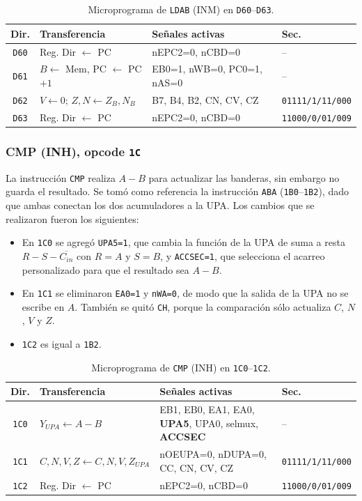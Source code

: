 \documentclass[letterpaper,12pt]{article}
\newcommand{\hx}[1]{\texttt{#1}}
\begin{document}
\begin{table}[H]
\centering
\scriptsize
\caption{Microprograma de \texttt{LDAB} (INM) en \hx{D60}--\hx{D63}.}
\label{tab:ldabinm}
\begin{tabularx}{\linewidth}{c l Y l}
\toprule
Dir. & Transferencia & Señales activas & Sec. \\
\midrule
\hx{D60} & Reg. Dir $\leftarrow$ PC & nEPC2=0, nCBD=0 & -- \\
\hx{D61} & $B\leftarrow$ Mem, PC $\leftarrow$ PC$+1$ & EB0=1, nWB=0, PC0=1, nAS=0 & -- \\
\hx{D62} & $V\leftarrow 0$; $Z,N\leftarrow Z_B,N_B$ & B7, B4, B2, CN, CV, CZ & \texttt{01111/1/11/000} \\
\hx{D63} & Reg. Dir $\leftarrow$ PC & nEPC2=0, nCBD=0 & \texttt{11000/0/01/009} \\
\bottomrule
\end{tabularx}
\end{table}

\subsubsection{CMP (INH), opcode \texttt{1C}}

La instrucción \texttt{CMP} realiza $A-B$ para actualizar las banderas, sin embargo no guarda el resultado. Se tomó como referencia la instrucción \texttt{ABA} (\hx{1B0}--\hx{1B2}), dado que ambas conectan los dos acumuladores a la UPA. Los cambios que se realizaron fueron los siguientes:

\begin{itemize}
  \item En \hx{1C0} se agregó \texttt{UPA5=1}, que cambia la función de la UPA de suma a resta $R-S-\overline{C_{in}}$ con $R=A$ y $S=B$, y \texttt{ACCSEC=1}, que selecciona el acarreo personalizado para que el resultado sea $A-B$.
  \item En \hx{1C1} se eliminaron \texttt{EA0=1} y \texttt{nWA=0}, de modo que la salida de la UPA no se escribe en $A$. También se quitó \texttt{CH}, porque la comparación sólo actualiza $C$, $N$, $V$ y $Z$.
  \item \hx{1C2} es igual a \hx{1B2}.
\end{itemize}

\begin{table}[H]
\centering
\scriptsize
\caption{Microprograma de \texttt{CMP} (INH) en \hx{1C0}--\hx{1C2}.}
\label{tab:cmp}
\begin{tabularx}{\linewidth}{c l Y l}
\toprule
Dir. & Transferencia & Señales activas & Sec. \\
\midrule
\hx{1C0} & $Y_{UPA}\leftarrow A-B$ & EB1, EB0, EA1, EA0, \textbf{UPA5}, UPA0, selmux, \textbf{ACCSEC} & -- \\
\hx{1C1} & $C,N,V,Z\leftarrow C,N,V,Z_{UPA}$ & nOEUPA=0, nDUPA=0, CC, CN, CV, CZ & \texttt{01111/1/11/000} \\
\hx{1C2} & Reg. Dir $\leftarrow$ PC & nEPC2=0, nCBD=0 & \texttt{11000/0/01/009} \\
\bottomrule
\end{tabularx}
\end{table}
\end{document}

